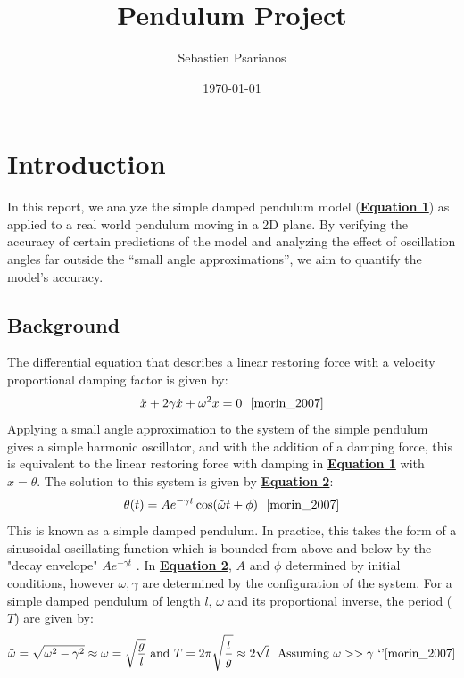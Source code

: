 \documentclass[
	letterpaper
	12pt
]{template}
\title{Pendulum Project}
\author{Sebastien Psarianos}
\date{\today}
\newcommand{\bref}[2]{\textbf{\hyperref[#1]{#2}}}
\begin{document}
\maketitle
\section{Introduction}
In this report, we analyze the simple damped pendulum model (\bref{eqn::oscillatorEqn}{Equation 1}) as applied to a real world pendulum moving in a 2D plane. By verifying the accuracy of certain predictions of the model and analyzing the effect of oscillation angles far outside the ``small angle approximations'', we aim to quantify the model's accuracy.

\subsection{Background}
The differential equation that describes a linear restoring force with a velocity proportional damping factor is given by:
\begin{equation}\label{eqn::oscillatorEqn}
		\ddot{x} + 2\gamma \dot x + \omega^2 x =0\ \  \text{\cite{morin_2007}}
\end{equation}
Applying a small angle approximation to the system of the simple pendulum gives a simple harmonic oscillator, and with the addition of a damping force, this is equivalent to the linear restoring force with damping in \bref{eqn::oscillatorEqn}{Equation 1} with $x= \theta$. The solution to this system is given by \bref{eqn::oscillatorSoln}{Equation 2}:
\begin{equation}\label{eqn::oscillatorSoln}
	\theta(t) = Ae^{-\gamma t}\cos(\tilde\omega t + \phi) \ \ \text{\cite{morin_2007}}
\end{equation}
This is known as a simple damped pendulum. In practice, this takes the form of a sinusoidal oscillating function which is bounded from above and below by the "decay envelope" $Ae^{-\gamma t}$ \cite{morin_2007}. In \bref{eqn::oscillatorSoln}{Equation 2}, $A$ and $\phi$ determined by initial conditions, however $\omega, \gamma$ are determined by the configuration of the system. For a simple damped pendulum of length $l$, $\omega$ and its proportional inverse, the period ($T$) are given by:
\begin{equation}\label{eqn::omegaValue}
	\tilde\omega = \sqrt{ \omega ^2 - \gamma ^2} \approx \omega = \sqrt{g\over l} \text{ and } T = 2\pi\sqrt{l\over g}\approx 2\sqrt{l} \ \ \text{Assuming $\omega >> \gamma$ `'\cite{morin_2007}}
\end{equation}
\end{document}

